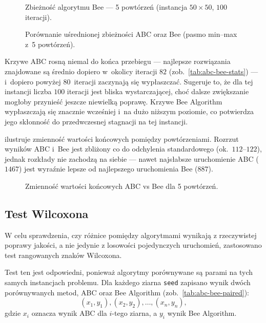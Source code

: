 \begin{figure}[H]
\centering

\caption{Zbieżność algorytmu Bee --- 5 powtórzeń (instancja $50\times50$, $100$ iteracji).}
\label{fig:conv-bee}
\end{figure}

\begin{figure}[H]
\centering

\caption{Porównanie uśrednionej zbieżności ABC oraz Bee (pasmo min--max z~5 powtórzeń).}
\label{fig:conv-compare}
\end{figure}

Krzywe ABC rosną niemal do końca przebiegu --- najlepsze rozwiązania znajdowane
są średnio dopiero w~okolicy iteracji $82$ (zob.\ \cref{tab:abc-bee-stats}) ---
i~dopiero powyżej $80$~iteracji zaczynają się wypłaszczać. Sugeruje to, że dla
tej instancji liczba $100$ iteracji jest bliska wystarczającej, choć dalsze
zwiększanie mogłoby przynieść jeszcze niewielką poprawę. Krzywe Bee Algorithm
wypłaszczają się znacznie wcześniej i~na dużo niższym poziomie, co potwierdza
jego skłonność do przedwczesnej stagnacji na tej instancji.

 ilustruje zmienność wartości końcowych pomiędzy
powtórzeniami. Rozrzut wyników ABC i~Bee jest zbliżony co do odchylenia
standardowego (ok.\ $112$--$122$), jednak rozkłady nie zachodzą na siebie ---
nawet najsłabsze uruchomienie ABC ($1467$) jest wyraźnie lepsze od najlepszego
uruchomienia Bee ($887$).

\begin{figure}[H]
\centering

\caption{Zmienność wartości końcowych ABC vs Bee dla 5 powtórzeń.}
\label{fig:final-box}
\end{figure}

\subsection{Test Wilcoxona}

W celu sprawdzenia, czy różnice pomiędzy algorytmami wynikają z rzeczywistej
poprawy jakości, a nie jedynie z losowości pojedynczych uruchomień, zastosowano
test rangowanych znaków Wilcoxona.

Test ten jest odpowiedni, ponieważ algorytmy porównywane są parami na tych
samych instancjach problemu. Dla każdego ziarna \texttt{seed} zapisano wynik
dwóch porównywanych metod, ABC oraz Bee Algorithm (zob.\ \cref{tab:abc-bee-paired}):
\[
    (x_1, y_1), (x_2, y_2), \ldots, (x_n, y_n),
\]
gdzie $x_i$ oznacza wynik ABC dla $i$-tego ziarna, a $y_i$ wynik Bee Algorithm.


